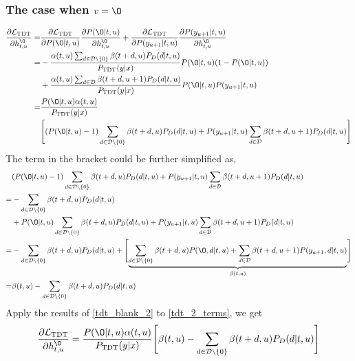 \documentclass{article}
\begin{document}
\subsubsection{The case when $v=\O$}
\begin{equation}
\begin{aligned}
 \frac{\partial{\mathcal{L}_\text{TDT}}}{\partial{h_{t, u}^{\O}}} = & \frac{\partial{\mathcal{L}_\text{TDT}}}{\partial{P(\O| t, u)}} \frac{\partial{P(\O| t, u)}}{\partial{h_{t, u}^{\O}}} + \frac{\partial{\mathcal{L}_\text{TDT}}}{\partial{P(y_{u+1}| t, u)}} \frac{\partial{P(y_{u+1}| t, u)}}{\partial{h_{t, u}^{\O}}}  \\
 = & -\frac{\alpha(t, u) \sum_{d \in \mathcal{D} \setminus \{0\}} {\beta(t + d,u) P_D(d|t, u)}} {P_\text{TDT}(y|x)} P(\O| t, u) (1 - P(\O| t, u)) \\
 & + \frac{\alpha(t, u) \sum_{d \in \mathcal{D}}                 {\beta(t + d,u+1)P_D(d|t,u)}} {P_\text{TDT}(y|x)} P(\O| t, u) P(y_{u+1}|t, u) \\
 = & \frac{P(\O|t, u) \alpha(t, u)}{P_\text{TDT}(y|x)}\\
 & \Biggl[ ( P(\O|t, u) - 1) \sum_{d \in \mathcal{D} \setminus \{0\}} {\beta(t + d,u) P_D(d|t, u)} + P(y_{u+1}|t, u) \sum_{d \in \mathcal{D}}                 {\beta(t + d,u+1)P_D(d|t,u)}  \Biggr]
 \end{aligned} 
\end{equation}
The term in the bracket could be further simplified as,
\begin{equation}\label{tdt_blank_2}
\begin{aligned}
& ( P(\O|t, u) - 1) \sum_{d \in \mathcal{D} \setminus \{0\}} {\beta(t + d,u) P_D(d|t, u)} + P(y_{u+1}|t, u) \sum_{d \in \mathcal{D}}                 {\beta(t + d,u+1)P_D(d|t,u)}   \\
= & -\sum_{d \in \mathcal{D} \setminus \{0\}} {\beta(t + d,u) P_D(d|t, u)} \\
& + P(\O|t, u) \sum_{d \in \mathcal{D} \setminus \{0\}} {\beta(t + d,u) P_D(d|t, u)} + P(y_{u+1}|t, u) \sum_{d \in \mathcal{D}}                 {\beta(t + d,u+1)P_D(d|t,u)}  \\
= & -\sum_{d \in \mathcal{D} \setminus \{0\}} {\beta(t + d,u) P_D(d|t, u)} + \Biggl[ \underbrace{\sum_{d \in \mathcal{D} \setminus \{0\}} {\beta(t + d,u) P(\O, d|t, u)} + \sum_{d \in \mathcal{D}}{\beta(t + d,u+1)P(y_{u+1}, d|t,u)}}_{\beta(t, u)} \Biggr] \\
= &\beta(t, u) -\sum_{d \in \mathcal{D} \setminus \{0\}} {\beta(t + d,u) P_D(d|t, u)} 
 \end{aligned}
\end{equation}
Apply the results of \ref{tdt_blank_2} to \ref{tdt_2_terms}, we get
\begin{equation}\label{tdt_fm_1}
\frac{\partial{\mathcal{L}_\text{TDT}}}{\partial{h_{t, u}^{\O}}} =    \frac{P(\O|t, u) \alpha(t, u)}{P_\text{TDT}(y|x)} \Biggl[\beta(t, u) -\sum_{d \in \mathcal{D} \setminus \{0\}} {\beta(t + d,u) P_D(d|t, u)}  \Biggr]
\end{equation}
\end{document}

